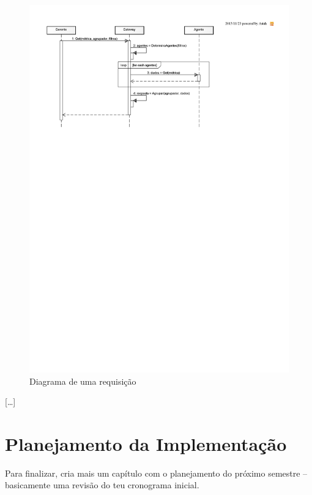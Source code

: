 \documentclass[twoside,english,brazilian]{UNISINOSmonografia}
\begin{document}
\begin{figure}
	\caption{Diagrama de uma requisição}
	\label{fig:arch-diagrama}
	\centering
	\begin{minipage}{.8\textwidth}
		\includegraphics[clip,trim=10mm 195mm 60mm 15mm,width=\textwidth,keepaspectratio=true]{arch_diagrama}
	\end{minipage}
\end{figure}


[\ldots]


\chapter{Planejamento da Implementação}
Para finalizar, cria mais um capítulo com o planejamento do próximo semestre 
-- basicamente uma revisão do teu cronograma inicial.
\end{document}
